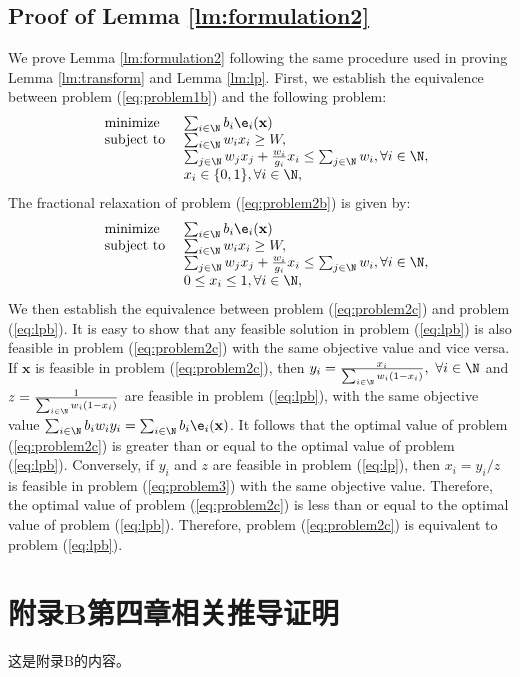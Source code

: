 \section{Proof of Lemma \ref{lm:formulation2}}\label{app2}
	We prove Lemma \ref{lm:formulation2} following the same procedure used in proving Lemma \ref{lm:transform} and Lemma \ref{lm:lp}. First, we establish the equivalence between problem (\ref{eq:problem1b}) and the following problem:
		\begin{equation}%
		\hspace{-0.0cm}
		\begin{array}
		[c]{lll}%
		&{\text{minimize}}&~\sum_{i\in\N}b_i\e_i(\mathbf{x})
		\\
		&\text{subject to}&~ \sum_{i\in\N}w_ix_i\ge W,\\
		&&~ \sum_{j\in\N}w_jx_j+\frac{w_i}{g_i}x_i\leq\sum_{j\in\N}w_i, \forall i\in\N,\\
		&&~ x_i\in\{0,1\}, \forall i\in\N,
		\end{array}
		\label{eq:problem2b}
		\end{equation}
		The fractional relaxation of problem (\ref{eq:problem2b}) is given by:
		\begin{equation}%
		\hspace{-0.0cm}
		\begin{array}
		[c]{lll}%
		&{\text{minimize}}&~\sum_{i\in\N}b_i\e_i(\mathbf{x})
		\\
		&\text{subject to}&~ \sum_{i\in\N}w_ix_i\ge W,\\
		&&~ \sum_{j\in\N}w_jx_j+\frac{w_i}{g_i}x_i\leq\sum_{j\in\N}w_i, \forall i\in\N,\\
		&&~ 0\leq x_i\leq 1, \forall i\in\N,
		\end{array}
		\label{eq:problem2c}
		\end{equation}
	We then establish the equivalence between problem (\ref{eq:problem2c}) and problem (\ref{eq:lpb}). It is easy to show that any feasible solution in problem (\ref{eq:lpb}) is also feasible in problem (\ref{eq:problem2c}) with the same objective value and vice versa. If $\mathbf{x}$ is feasible in problem  (\ref{eq:problem2c}), then  $y_i=\frac{x_i}{\sum_{i\in\N}w_i(1-x_i)},~\forall i\in\N$ and $z=\frac{1}{\sum_{i\in\N}w_i(1-x_i)}$ are feasible in problem (\ref{eq:lpb}), with the same objective value $\sum_{i\in\N}b_iw_iy_i=\sum_{i\in\N}b_i\e_i(\mathbf{x})$. It follows that the optimal value of problem  (\ref{eq:problem2c}) is greater than or equal to the optimal value of problem (\ref{eq:lpb}). Conversely, if $y_i$ and $z$ are feasible in problem (\ref{eq:lp}), then $x_i=y_i/z$ is feasible in problem (\ref{eq:problem3}) with the same objective value. Therefore, the optimal value of problem  (\ref{eq:problem2c}) is less than or equal to the optimal value of problem (\ref{eq:lpb}). Therefore, problem (\ref{eq:problem2c}) is equivalent to problem (\ref{eq:lpb}).

\chapter{附录B第四章相关推导证明}

这是附录B的内容。

